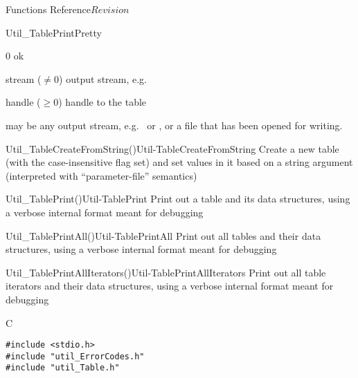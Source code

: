 \begin{cactuspart}{ Functions Reference}{}{$Revision$}
\begin{FunctionDescription}{Util\_TablePrintPretty}
\begin{ResultSection}
\begin{Result}{\rm 0}
ok
\end{Result}
\end{ResultSection}

\begin{ParameterSection}
\begin{Parameter}{stream ($\ne 0$)}
output stream, e.g.\ 
\end{Parameter}
\begin{Parameter}{handle ($\ge 0$)}
handle to the table
\end{Parameter}
\end{ParameterSection}

\begin{Discussion}
 may be any output stream, e.g.\  or
, or a file that has been opened for writing.
\end{Discussion}

\begin{SeeAlsoSection}
\begin{SeeAlso2}{Util\_TableCreateFromString()}{Util-TableCreateFromString}
Create a new table (with the case-insensitive flag set) and set values
in it based on a string argument (interpreted with ``parameter-file''
semantics)
\end{SeeAlso2}
\begin{SeeAlso2}{Util\_TablePrint()}{Util-TablePrint}
Print out a table and its data structures, using a verbose internal
format meant for debugging
\end{SeeAlso2}
\begin{SeeAlso2}{Util\_TablePrintAll()}{Util-TablePrintAll}
Print out all tables and their data structures, using a verbose
internal format meant for debugging
\end{SeeAlso2}
\begin{SeeAlso2}{Util\_TablePrintAllIterators()}{Util-TablePrintAllIterators}
Print out all table iterators and their data structures, using a
verbose internal format meant for debugging
\end{SeeAlso2}
\end{SeeAlsoSection}


\begin{ExampleSection}
\begin{Example}{C}
\begin{verbatim}
#include <stdio.h>
#include "util_ErrorCodes.h"
#include "util_Table.h"


\end{verbatim}
\end{Example}
\end{ExampleSection}
\end{FunctionDescription}
\end{cactuspart}

